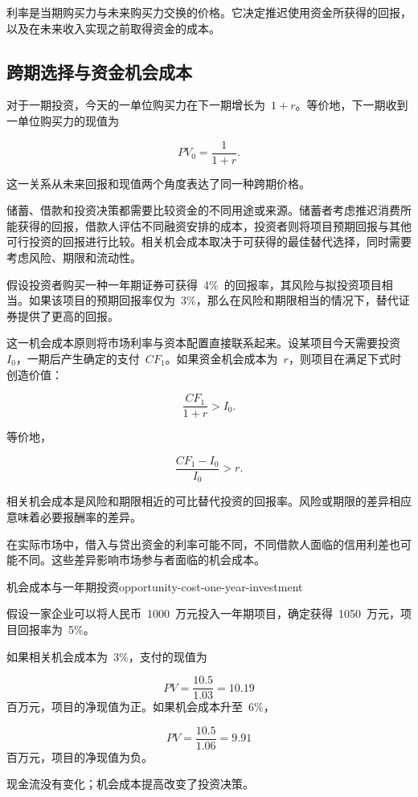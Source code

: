 利率是当期购买力与未来购买力交换的价格。它决定推迟使用资金所获得的回报，以及在未来收入实现之前取得资金的成本。

\subsection{跨期选择与资金机会成本}

对于一期投资，今天的一单位购买力在下一期增长为~\(1+r\)。等价地，下一期收到一单位购买力的现值为

\[
PV_0=\frac{1}{1+r}.
\]

这一关系从未来回报和现值两个角度表达了同一种跨期价格。

储蓄、借款和投资决策都需要比较资金的不同用途或来源。储蓄者考虑推迟消费所能获得的回报，借款人评估不同融资安排的成本，投资者则将项目预期回报与其他可行投资的回报进行比较。相关机会成本取决于可获得的最佳替代选择，同时需要考虑风险、期限和流动性。

假设投资者购买一种一年期证券可获得~4\%~的回报率，其风险与拟投资项目相当。如果该项目的预期回报率仅为~3\%，那么在风险和期限相当的情况下，替代证券提供了更高的回报。

这一机会成本原则将市场利率与资本配置直接联系起来。设某项目今天需要投资~$I_0$，一期后产生确定的支付~$CF_1$。如果资金机会成本为~$r$，则项目在满足下式时创造价值：

\begin{equation*}
\frac{CF_1}{1+r}>I_0.
\label{eq:ch6-one-period-investment-condition}
\end{equation*}

等价地，

\begin{equation*}
\frac{CF_1-I_0}{I_0}>r.
\label{eq:ch6-return-hurdle-simple}
\end{equation*}

相关机会成本是风险和期限相近的可比替代投资的回报率。风险或期限的差异相应意味着必要报酬率的差异。

在实际市场中，借入与贷出资金的利率可能不同，不同借款人面临的信用利差也可能不同。这些差异影响市场参与者面临的机会成本。

\begin{example}{机会成本与一年期投资}{opportunity-cost-one-year-investment}

假设一家企业可以将人民币~1000~万元投入一年期项目，确定获得~1050~万元，项目回报率为~5\%。

如果相关机会成本为~3\%，支付的现值为

$$
PV=\frac{10.5}{1.03}=10.19
$$
百万元，项目的净现值为正。如果机会成本升至~6\%，

$$
PV=\frac{10.5}{1.06}=9.91
$$
百万元，项目的净现值为负。

现金流没有变化；机会成本提高改变了投资决策。

\end{example}


